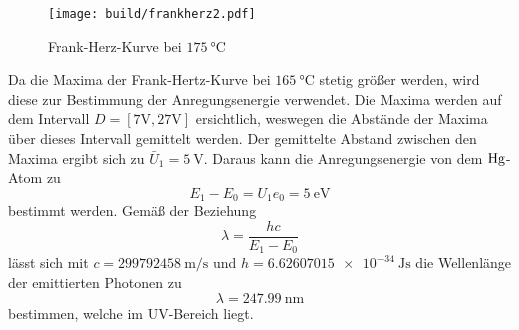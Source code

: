 \begin{figure}
    \centering
    \caption{Frank-Herz-Kurve bei $\SI{175}{\celsius}$}
    \label{fig:frankherz2}
    \texttt{[image: build/frankherz2.pdf]}
\end{figure}
Da die Maxima der Frank-Hertz-Kurve bei $\SI{165}{\celsius}$ stetig größer werden, wird diese zur Bestimmung der Anregungsenergie verwendet.
Die Maxima werden auf dem Intervall $D = [7\si{\volt}, 27\si{\volt}]$ ersichtlich, weswegen die Abstände der Maxima über dieses Intervall gemittelt werden.
Der gemittelte Abstand zwischen den Maxima ergibt sich zu $\bar{U}_\text{1} = \SI{5}{\volt}$.
Daraus kann die Anregungsenergie von dem $\ce{Hg}$-Atom zu 
\begin{equation*}
    E_1 - E_0 = U_1 e_0 = \SI{5}{\electronvolt}
\end{equation*}
bestimmt werden.
Gemäß der Beziehung
\begin{equation*}
    \lambda =  \frac{hc}{E_1 - E_0}
\end{equation*}
lässt sich mit $c = \SI{299792458}{\metre\per\second}$\cite{speedoflight} und $h = \SI{6.62607015e-34}{\joule\second}$\cite{plank}
die Wellenlänge der emittierten Photonen zu
\begin{equation*}
    \lambda = \SI{247.99}{\nano\metre}
\end{equation*}
bestimmen, welche im UV-Bereich liegt.